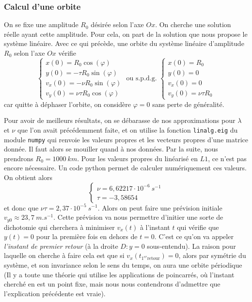 \documentclass[12pt]{article}
\theoremstyle{definition}
\theoremstyle{definition}
\begin{document}
	
	\subsubsection{Calcul d'une orbite}
	On se fixe une amplitude $R_0$ désirée selon l'axe $Ox$. On cherche une solution réelle ayant cette amplitude. Pour cela, on part de la solution que nous propose le système linéaire. Avec ce qui précède, une orbite du système linéaire d'amplitude $R_0$ selon l'axe $Ox$ vérifie
	\begin{equation}
		\begin{cases}
			x(0) = R_0\cos(\varphi) \\
			y(0) = - \tau R_0 \sin(\varphi) \\
			v_x(0) = -\nu R_0 \sin(\varphi) \\
			v_y(0) = \nu\tau R_0 \cos(\varphi)
		\end{cases} 
		\text{ ou s.p.d.g. }
		\begin{cases}
			x(0) = R_0 \\
			y(0) = 0 \\
			v_x(0) = 0 \\
			v_y(0) = \nu\tau R_0
		\end{cases} 
	\end{equation}
	car quitte à déphaser l'orbite, on considère $\varphi = 0$ sans perte de généralité.
	
	Pour avoir de meilleurs résultats, on se débarasse de nos approximations pour $\lambda$ et $\nu$ que l'on avait précédemment faite, et on utilise la fonction \verb|linalg.eig| du module \verb|numpy| qui renvoie les valeurs propres et les vecteurs propres d'une matrice donnée. Il faut alors se mouiller quand à nos données. Par la suite, nous prendrons $R_0 = 1000 \: km$. Pour les valeurs propres du linéarisé en $L1$, ce n'est pas encore nécessaire. Un code python permet de calculer numériquement ces valeurs. On obtient alors
	\begin{equation}
		\begin{cases}
			\nu = 6,62217\cdot 10^{-6} \: s^{-1}
			\\
			\tau = -3,58654
		\end{cases}
	\end{equation}
	et donc que $\nu\tau = 2,37\cdot10^{-5} \: s^{-1}$. Alors on peut faire une prévision initiale $v_{y0} \approx 23,7 \: m.s^{-1}$. Cette prévision va nous permettre d'initier une sorte de dichotomie qui cherchera à minimiser $v_x(t)$ à l'instant $t$ qui vérifie que $y(t) = 0$ pour la première fois en dehors de $t = 0$. C'est ce qu'on va appeler \textit{l'instant de premier retour} (à la droite $D:y=0$ sous-entendu). La raison pour laquelle on cherche à faire cela est que si $v_x(t_{1^{er}\text{retour}}) = 0$, alors par symétrie du système, et son invariance selon le sens du temps, on aura une orbite périodique (Il y a toute une théorie qui utilise les applications de poincarrés, où l'instant cherché en est un point fixe, mais nous nous contendrons d'admettre que l'explication précédente est vraie).
	
\end{document}
